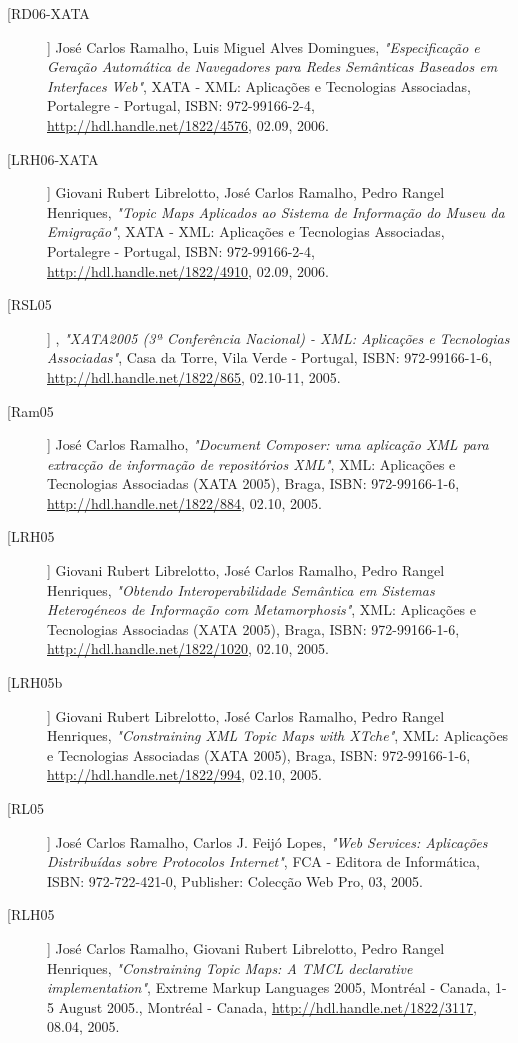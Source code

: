 \begin{description}
\item[[RD06-XATA]]
    \textsf{José Carlos Ramalho, Luis Miguel Alves Domingues}, \emph{"Especificação e Geração Automática de Navegadores para Redes Semânticas Baseados em Interfaces Web"}, XATA - XML: Aplicações e Tecnologias Associadas, Portalegre - Portugal, ISBN: 972-99166-2-4, \url{http://hdl.handle.net/1822/4576}, 02.09, 2006.

\item[[LRH06-XATA]]
    \textsf{Giovani Rubert Librelotto, José Carlos Ramalho, Pedro Rangel Henriques}, \emph{"Topic Maps Aplicados ao Sistema de Informação do Museu da Emigração"}, XATA - XML: Aplicações e Tecnologias Associadas, Portalegre - Portugal, ISBN: 972-99166-2-4, \url{http://hdl.handle.net/1822/4910}, 02.09, 2006.

\item[[RSL05]]
    \textsf{}, \emph{"XATA2005 (3ª Conferência Nacional) - XML: Aplicações e Tecnologias Associadas"}, Casa da Torre, Vila Verde - Portugal, ISBN: 972-99166-1-6, \url{http://hdl.handle.net/1822/865}, 02.10-11, 2005.

\item[[Ram05]]
    \textsf{José Carlos Ramalho}, \emph{"Document Composer: uma aplicação XML para extracção de informação de repositórios XML"}, XML: Aplicações e Tecnologias Associadas (XATA 2005), Braga, ISBN: 972-99166-1-6, \url{http://hdl.handle.net/1822/884}, 02.10, 2005.

\item[[LRH05]]
    \textsf{Giovani Rubert Librelotto, José Carlos Ramalho, Pedro Rangel Henriques}, \emph{"Obtendo Interoperabilidade Semântica em Sistemas Heterogéneos de Informação com Metamorphosis"}, XML: Aplicações e Tecnologias Associadas (XATA 2005), Braga, ISBN: 972-99166-1-6, \url{http://hdl.handle.net/1822/1020}, 02.10, 2005.

\item[[LRH05b]]
    \textsf{Giovani Rubert Librelotto, José Carlos Ramalho, Pedro Rangel Henriques}, \emph{"Constraining XML Topic Maps with XTche"}, XML: Aplicações e Tecnologias Associadas (XATA 2005), Braga, ISBN: 972-99166-1-6, \url{http://hdl.handle.net/1822/994}, 02.10, 2005.

\item[[RL05]]
    \textsf{José Carlos Ramalho, Carlos J. Feijó Lopes}, \emph{"Web Services: Aplicações Distribuídas sobre Protocolos Internet"}, FCA - Editora de Informática, ISBN: 972-722-421-0, Publisher: Colecção Web Pro, 03, 2005.

\item[[RLH05]]
    \textsf{José Carlos Ramalho, Giovani Rubert Librelotto, Pedro Rangel Henriques}, \emph{"Constraining Topic Maps: A TMCL declarative implementation"}, Extreme Markup Languages 2005, Montréal - Canada, 1-5 August 2005., Montréal - Canada, \url{http://hdl.handle.net/1822/3117}, 08.04, 2005.


\end{description}
